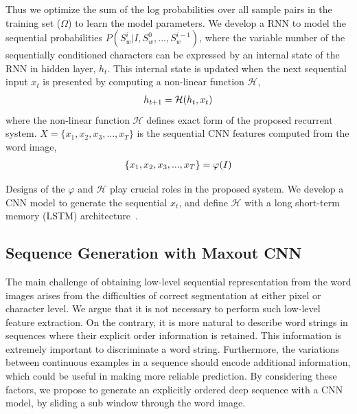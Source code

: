 \documentclass[letterpaper]{article}
\begin{document}
Thus we optimize the sum of the log probabilities over all sample pairs in the training set ($\Omega$) to learn the model parameters. We develop a RNN to model the sequential probabilities $P(S_w^i|I,S_w^0,...,S_w^{i-1})$, where the variable number of the  sequentially conditioned characters can be expressed by an internal state of the RNN in hidden layer, $h_t$. This internal state is updated when the next sequential input $x_t$ is presented by computing a non-linear function $\mathcal{H}$,
\begin{eqnarray}
\abovedisplayskip
\belowdisplayskip
h_{t+1}=\mathcal{H}(h_t,x_t)
\end{eqnarray}
where the non-linear function $\mathcal{H}$ defines exact form of the proposed recurrent system. $X=\{x_1,x_2,x_3,...,x_T\}$ is the sequential CNN features computed from the word image,
\begin{eqnarray}
\abovedisplayskip
\belowdisplayskip
\{x_1,x_2,x_3,...,x_T\}=\varphi(I)
\end{eqnarray}

Designs of the $\varphi$ and $\mathcal{H}$ play crucial roles in the proposed system. We develop a CNN model to generate the sequential $x_t$, and define $\mathcal{H}$ with a long short-term memory (LSTM) architecture~\cite{Hochreiter1997}.



\subsection{Sequence Generation with Maxout CNN}

The main challenge of obtaining low-level sequential representation from the word images arises from the difficulties of correct segmentation at either pixel or character level.
%
%
We argue that it is not necessary to perform such low-level feature extraction.
%
On the contrary, it is more natural to describe word strings in sequences where their explicit order information is retained. This information is extremely important to discriminate a word string. Furthermore, the variations between continuous examples in a sequence should encode additional information, which could be useful in making more reliable prediction. By considering these factors, we propose to generate an explicitly ordered deep sequence with a CNN model, by sliding a sub window through the word image.
\end{document}
